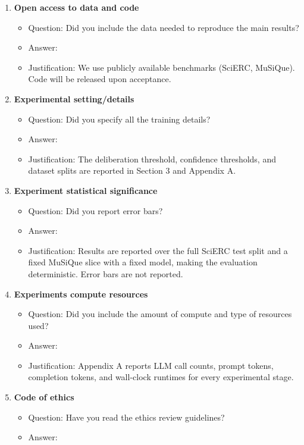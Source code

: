 \documentclass{article}
\begin{document}
\begin{enumerate}
\item {\bf Open access to data and code}
\begin{itemize}
\item[] Question: Did you include the data needed to reproduce the main results?
\item[] Answer: \answerNo{}
\item[] Justification: We use publicly available benchmarks (SciERC, MuSiQue). Code will be released upon acceptance.
\end{itemize}

\item {\bf Experimental setting/details}
\begin{itemize}
\item[] Question: Did you specify all the training details?
\item[] Answer: \answerYes{}
\item[] Justification: The deliberation threshold, confidence thresholds, and dataset splits are reported in Section 3 and Appendix A.
\end{itemize}

\item {\bf Experiment statistical significance}
\begin{itemize}
\item[] Question: Did you report error bars?
\item[] Answer: \answerNo{}
\item[] Justification: Results are reported over the full SciERC test split and a fixed MuSiQue slice with a fixed model, making the evaluation deterministic. Error bars are not reported.
\end{itemize}

\item {\bf Experiments compute resources}
\begin{itemize}
\item[] Question: Did you include the amount of compute and type of resources used?
\item[] Answer: \answerYes{}
\item[] Justification: Appendix A reports LLM call counts, prompt tokens, completion tokens, and wall-clock runtimes for every experimental stage.
\end{itemize}

\item {\bf Code of ethics}
\begin{itemize}
\item[] Question: Have you read the ethics review guidelines?
\item[] Answer: \answerYes{}
\end{itemize}


\end{enumerate}
\end{document}
